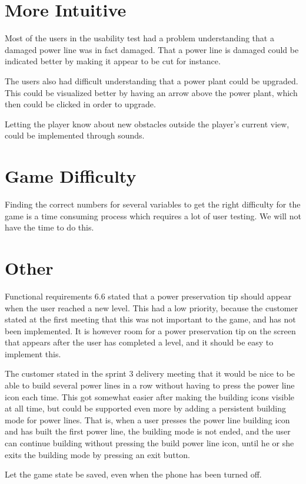 \section*{More Intuitive}

Most of the users in the usability test had a problem understanding that a damaged power 
line was in fact damaged. That a power line is damaged could be indicated better by making 
it appear to be cut for instance.

The users also had difficult understanding that a power plant could be upgraded. This could 
be visualized better by having an arrow above the power plant, which then could be clicked in 
order to upgrade.

Letting the player know about new obstacles outside the player's current view, could be implemented 
through sounds.

\section*{Game Difficulty}

Finding the correct numbers for several variables to get the right difficulty for the game is a time consuming process which requires a lot of user testing. We will not have the time to do this.

\section*{Other}

Functional requirements 6.6 stated that a power preservation tip should appear when the user 
reached a new level. This had a low priority, because the customer stated at the first meeting 
that this was not important to the game, and has not been implemented. It is however room for a 
power preservation tip on the screen that appears after the user has completed a level, and it 
should be easy to implement this.

The customer stated in the sprint 3 delivery meeting that it would be nice to be able to build 
several power lines in a row without having to press the power line icon each time. This got 
somewhat easier after making the building icons visible at all time, but could be supported even 
more by adding a persistent building mode for power lines. That is, when a user presses the power 
line building icon and has built the first power line, the building mode is not ended, and the user 
can continue building without pressing the build power line icon, until he or she exits the building 
mode by pressing an exit button.

Let the game state be saved, even when the phone has been turned off.